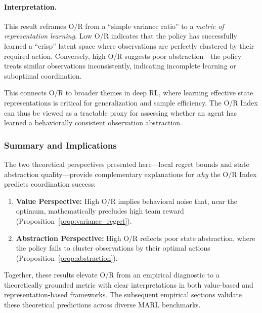 \paragraph{Interpretation.}
This result reframes O/R from a ``simple variance ratio'' to a \textit{metric of representation learning}. Low O/R indicates that the policy has successfully learned a ``crisp'' latent space where observations are perfectly clustered by their required action. Conversely, high O/R suggests poor abstraction—the policy treats similar observations inconsistently, indicating incomplete learning or suboptimal coordination.

This connects O/R to broader themes in deep RL, where learning effective state representations is critical for generalization and sample efficiency. The O/R Index can thus be viewed as a tractable proxy for assessing whether an agent has learned a behaviorally consistent observation abstraction.

\subsubsection{Summary and Implications}

The two theoretical perspectives presented here—local regret bounds and state abstraction quality—provide complementary explanations for \textit{why} the O/R Index predicts coordination success:

\begin{enumerate}
\item \textbf{Value Perspective:} High O/R implies behavioral noise that, near the optimum, mathematically precludes high team reward (Proposition~\ref{prop:variance_regret}).
\item \textbf{Abstraction Perspective:} High O/R reflects poor state abstraction, where the policy fails to cluster observations by their optimal actions (Proposition~\ref{prop:abstraction}).
\end{enumerate}

Together, these results elevate O/R from an empirical diagnostic to a theoretically grounded metric with clear interpretations in both value-based and representation-based frameworks. The subsequent empirical sections validate these theoretical predictions across diverse MARL benchmarks.
